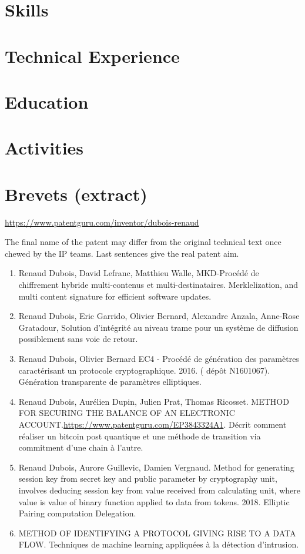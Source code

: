 \documentclass[letter,10pt]{article}
\begin{document}


\section{Skills}


\section{Technical Experience}


\section{Education}



\section{Activities}

 
\section{Brevets (extract)}
\url{https://www.patentguru.com/inventor/dubois-renaud}

The final name of the patent may differ from the original technical text once chewed by the IP teams. Last sentences give the real patent aim.
 \begin{enumerate}
  \item  Renaud Dubois, David Lefranc, Matthieu Walle, MKD-Procédé de chiffrement hybride multi-contenus et multi-destinataires. Merklelization, and multi content signature for efficient software updates.
  \item Renaud Dubois, Eric Garrido, Olivier Bernard, Alexandre Anzala, Anne-Rose Gratadour, Solution d'intégrité au niveau trame pour un système de diffusion possiblement sans voie de retour.
  \item Renaud Dubois, Olivier Bernard EC4 - Procédé de génération des paramètres caractérisant un protocole cryptographique. 2016. ( dépôt N1601067). Génération transparente de paramètres elliptiques.
 \item Renaud Dubois, Aurélien Dupin, Julien Prat, Thomas Ricosset. METHOD FOR SECURING THE BALANCE OF AN ELECTRONIC ACCOUNT.\url{https://www.patentguru.com/EP3843324A1}. Décrit comment réaliser un bitcoin post quantique et une méthode de transition via commitment d'une chain à l'autre.
 \item Renaud Dubois, Aurore Guillevic, Damien Vergnaud. Method for generating session key from secret key and public parameter by cryptography unit, involves deducing session key from value received from calculating unit, where value is value of binary function applied to data from tokens. 2018. Elliptic Pairing computation Delegation.
 \item  METHOD OF IDENTIFYING A PROTOCOL GIVING RISE TO A DATA FLOW. Techniques de machine learning appliquées à la détection d'intrusion.
 \end{enumerate}  
  
\end{document}
